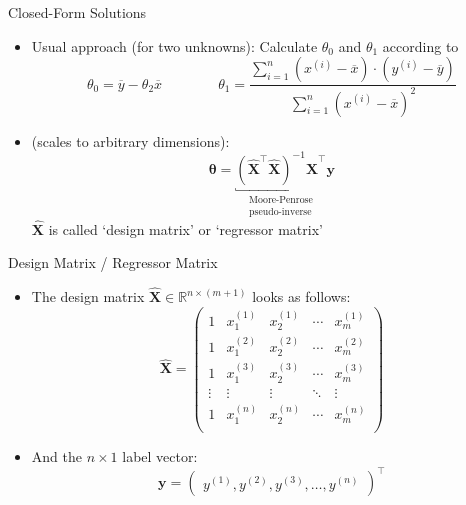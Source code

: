 \begin{frame}{Closed-Form Solutions}{}
	\begin{itemize}
		\item Usual approach (for two unknowns): Calculate $\theta_0$ and $\theta_1$ according to
		\begin{equation}
			\theta_0 = \overline{y} - \theta_2 \overline{x} \qquad\qquad
			\theta_1 = \frac{\sum_{i=1}^n (x^{(i)} - \overline{x}) \cdot
				(y^{(i)} - \overline{y})}{\sum_{i=1}^n (x^{(i)} - \overline{x})^2}
		\end{equation}
		\item {} (scales to arbitrary dimensions):
		\begin{equation}
			\bm{\theta} = \underbracket{
				(\bm{\widehat{X}}^{\intercal} \bm{\widehat{X}})^{-1} \bm{\widehat{X}}^{\intercal}
			}_{\substack{\text{Moore-Penrose} \\ \text{pseudo-inverse}}} \bm{y}
		\end{equation}
		$\bm{\widehat{X}}$ is called `design matrix' or `regressor matrix'
	\end{itemize}
\end{frame}


\begin{frame}{Design Matrix / Regressor Matrix}{}
	\begin{itemize}
		\item The design matrix $\bm{\widehat{X}} \in \mathbb{R}^{n \times (m + 1)}$ looks as follows:
		\footnotesize
		\begin{equation}
			\bm{\widehat{X}} =
			\begin{pmatrix}
  				1 & x_1^{(1)} & x_2^{(1)} & \cdots & x_m^{(1)} \\
				1 & x_1^{(2)} & x_2^{(2)} & \cdots & x_m^{(2)} \\
				1 & x_1^{(3)} & x_2^{(3)} & \cdots & x_m^{(3)} \\
				\vdots & \vdots & \vdots & \ddots & \vdots \\
				1 & x_1^{(n)} & x_2^{(n)} & \cdots & x_m^{(n)} \\
 			\end{pmatrix}
		\end{equation}
		\normalsize
		\item And the $n \times 1$ label vector:
		\footnotesize
		\begin{equation*}
			 \bm{y} =
			 \begin{pmatrix}
				y^{(1)}, y^{(2)}, y^{(3)}, \dots, y^{(n)}
			\end{pmatrix}^{\intercal}
		\end{equation*}
	\end{itemize}
\end{frame}


